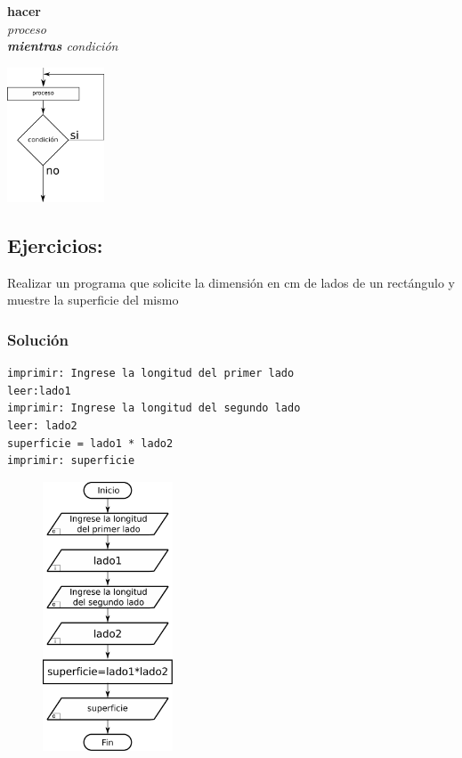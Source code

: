 \begin{minipage}{0.5\textwidth}
  \textbf{hacer} \\
  \hspace*{10mm}\it{proceso}\\
  \textbf{mientras} \it{condición}\\
\end{minipage}
\begin{minipage}{0.5\textwidth}
\center
  \includegraphics[height=40mm]{img/hacer_mientras.pdf}
\end{minipage}

\setcounter{subsection}{4}
\subsection{Ejercicios:}
Realizar un programa que solicite la dimensión en cm de lados de un rectángulo y muestre la superficie del mismo

\subsubsection*{Solución}
\begin{lstlisting}[style=pseudocodigo]
imprimir: Ingrese la longitud del primer lado
leer:lado1
imprimir: Ingrese la longitud del segundo lado
leer: lado2
superficie = lado1 * lado2
imprimir: superficie
\end{lstlisting}

\begin{figure}[h!]
  \centering
  \includegraphics[height=80mm]{./img/ejercicio_1.pdf} 
\end{figure}

